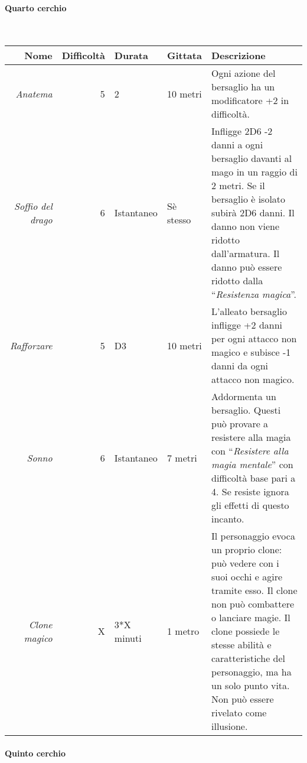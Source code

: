 \documentclass[../manuale_main.tex]{subfiles}
\begin{document}
\paragraph{Quarto cerchio}\mbox{}\\

\begin{tabularx}{\linewidth}{|N| D| T| G| Y|}
\hline
\textbf{Nome} & \textbf{Difficoltà} & \textbf{Durata} & \textbf{Gittata} & \textbf{Descrizione} \\ \hline\hline
\textit{Anatema} & 5 & 2 & 10 metri &Ogni azione del bersaglio ha un modificatore +2 in difficoltà.  \\ \hline
\textit{Soffio del drago} &6  &Istantaneo  & Sè stesso  &Infligge 2D6 -2 danni a ogni bersaglio davanti al mago in un raggio di 2 metri. Se il bersaglio è isolato subirà 2D6 danni. Il danno non viene ridotto dall'armatura. Il danno può essere ridotto dalla ``\emph{Resistenza magica}”. \\ \hline
\textit{Rafforzare} & 5 & D3 & 10 metri &L’alleato bersaglio infligge +2 danni per ogni attacco non magico e subisce -1 danni da ogni attacco non magico.  \\ \hline
\textit{Sonno} & 6  & Istantaneo & 7 metri & Addormenta un bersaglio. Questi può provare a resistere alla magia con ``\emph{Resistere alla magia mentale}'' con difficoltà base pari a 4. Se resiste ignora gli effetti di questo incanto.\\ \hline
\textit{Clone magico} & X & 3*X minuti & 1 metro & Il personaggio evoca un proprio clone: può vedere con i suoi occhi e agire tramite esso. Il clone non può combattere o lanciare magie. Il clone possiede le stesse abilità e caratteristiche del personaggio, ma ha un solo punto vita. Non può essere rivelato come illusione.\\
\hline
\end{tabularx}

\paragraph{Quinto cerchio}\mbox{}\\
\end{document}
